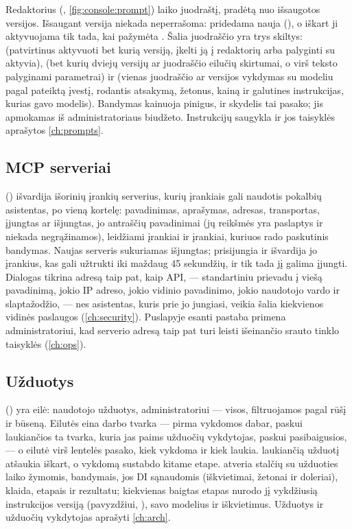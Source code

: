 Redaktorius (, \cref{fig:console:prompt}) laiko juodraštį, pradėtą nuo
išsaugotos versijos. Išsaugant versija niekada neperrašoma: pridedama nauja
(), o iškart ji aktyvuojama tik tada, kai pažymėta
. Šalia juodraščio yra trys skiltys:  (patvirtinus
aktyvuoti bet kurią versiją, įkelti ją į redaktorių arba palyginti su aktyvia),
 (bet kurių dviejų versijų ar juodraščio eilučių skirtumai, o virš teksto
palyginami parametrai) ir  (vienas juodraščio ar versijos vykdymas su modeliu pagal
pateiktą įvestį, rodantis atsakymą, žetonus, kainą ir galutines instrukcijas, kurias gavo
modelis). Bandymas kainuoja pinigus, ir skydelis tai pasako; jis apmokamas iš administratoriaus
biudžeto. Instrukcijų saugykla ir jos taisyklės aprašytos \cref{ch:prompts}.

\subsection{MCP serveriai}\label{sec:console:mcp}

 () išvardija išorinių įrankių serverius, kurių
įrankiais gali naudotis pokalbių asistentas, po vieną kortelę: pavadinimas, aprašymas, adresas,
transportas, įjungtas ar išjungtas, jo antraščių pavadinimai (jų reikšmės yra paslaptys ir
niekada negrąžinamos), leidžiami įrankiai ir įrankiai, kuriuos rado paskutinis bandymas. Naujas
serveris sukuriamas išjungtas;  prisijungia ir išvardija jo įrankius, kas gali
užtrukti iki maždaug 45 sekundžių, ir tik tada jį galima įjungti. Dialogas tikrina adresą taip
pat, kaip API, ---  standartiniu prievadu į viešą pavadinimą, jokio IP adreso,
jokio vidinio pavadinimo, jokio naudotojo vardo ir slaptažodžio, --- nes asistentas, kuris prie
jo jungiasi, veikia šalia kiekvienos vidinės paslaugos (\cref{ch:security}). Puslapyje esanti
pastaba primena administratoriui, kad serverio adresą taip pat turi leisti išeinančio srauto
tinklo taisyklės (\cref{ch:ops}).

\subsection{Užduotys}\label{sec:console:jobs}

 () yra eilė: naudotojo užduotys, administratoriui ---
visos, filtruojamos pagal rūšį ir būseną. Eilutės eina darbo tvarka --- pirma vykdomos dabar,
paskui laukiančios ta tvarka, kuria jas paims užduočių vykdytojas, paskui pasibaigusios, --- o
eilutė virš lentelės pasako, kiek vykdoma ir kiek laukia.  laukiančią
užduotį atšaukia iškart, o vykdomą sustabdo kitame etape.  atveria
stalčių su užduoties laiko žymomis, bandymais, jos DI sąnaudomis (iškvietimai, žetonai ir
doleriai), klaida, etapais ir rezultatu; kiekvienas baigtas etapas nurodo jį vykdžiusią instrukcijos
versiją (pavyzdžiui, ), savo modelius ir iškvietimus. Užduotys ir
užduočių vykdytojas aprašyti \cref{ch:arch}.

